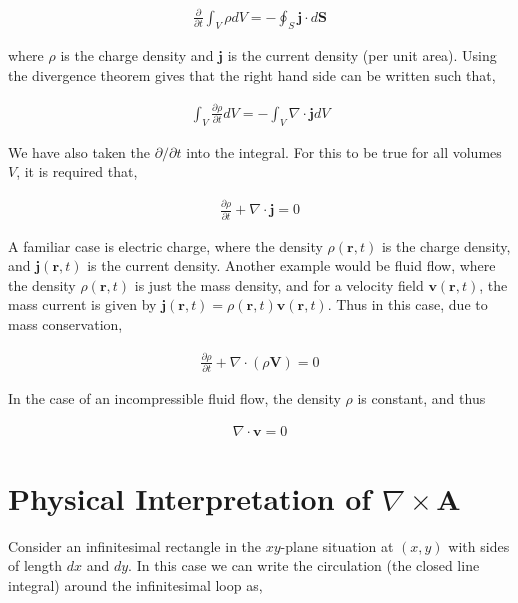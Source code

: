 \documentclass[11pt]{amsart}
\begin{document}
\begin{align*}
  \frac{\partial}{\partial t} \int_V \rho dV = - \oint_S \mathbf{j} \cdot d \mathbf{S}
\end{align*}

where $\rho$ is the charge density and $\mathbf{j}$ is the current density (per unit area). Using the divergence theorem gives that the right hand side can be written such that,

\begin{align*}
  \int_V \frac{\partial \rho}{\partial t} dV = - \int_V \nabla \cdot \mathbf{j} dV
\end{align*}

We have also taken the $\partial/\partial t$ into the integral. For this to be true for all volumes $V$, it is required that,

\begin{align*}
  \frac{\partial \rho}{\partial t} + \nabla \cdot \mathbf{j} = 0
\end{align*}

A familiar case is electric charge, where the density $\rho(\mathbf{r}, t)$ is the charge density, and $\mathbf{j}(\mathbf{r}, t)$ is the current density. Another example would be fluid flow, where the density $\rho(\mathbf{r}, t)$ is just the mass density, and for a velocity field $\mathbf{v}(\mathbf{r}, t)$, the mass current is given by $\mathbf{j}(\mathbf{r}, t) = \rho(\mathbf{r}, t)\mathbf{v}(\mathbf{r}, t)$. Thus in this case, due to mass conservation,

\begin{align*}
  \frac{\partial \rho}{\partial t} + \nabla \cdot (\rho \mathbf{V}) = 0
\end{align*}

In the case of an incompressible fluid flow, the density $\rho$ is constant, and thus

\begin{align*}
  \nabla \cdot \mathbf{v} = 0
\end{align*}

\section{Physical Interpretation of $\nabla \times \mathbf{A}$}

Consider an infinitesimal rectangle in the $xy$-plane situation at $(x, y)$ with sides of length $dx$ and $dy$. In this case we can write the circulation (the closed line integral) around the infinitesimal loop as,
\end{document}
